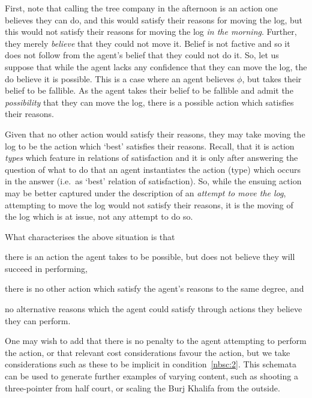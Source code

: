 \documentclass[10pt]{article}
\begin{document}
{First, note that calling the tree company in the afternoon is an action one believes they can do, and this would satisfy their reasons for moving the log, but this would not satisfy their reasons for moving the log \emph{in the morning}.
Further, they merely \emph{believe} that they could not move it.
Belief is not factive and so it does not follow from the agent's belief that they could not do it.
So, let us suppose that while the agent lacks any confidence that they can move the log, the do believe it is possible.
This is a case where an agent believes \(\phi\), but takes their belief to be fallible.
As the agent takes their belief to be fallible and admit the \emph{possibility} that they can move the log, there is a possible action which satisfies their reasons.

Given that no other action would satisfy their reasons, they may take moving the log to be the action which `best' satisfies their reasons.
Recall, that it is action \emph{types} which feature in relations of satisfaction and it is only after answering the question of what to do that an agent instantiates the action (type) which occurs in the answer (i.e.\ as `best' relation of satisfaction).
So, while the ensuing action may be better captured under the description of an \emph{attempt to move the log}, attempting to move the log would not satisfy their reasons, it is the moving of the log which is at issue, not any attempt to do so.

What characterises the above situation is that
\begin{enumerate*}[label=\alph*)]
\item\label{nbsc:3} there is an action the agent takes to be possible, but does not believe they will succeed in performing,
\item\label{nbsc:1} there is no other action which satisfy the agent's reasons to the same degree, and
\item\label{nbsc:2} no alternative reasons which the agent could satisfy through actions they believe they can perform.
\end{enumerate*}
One may wish to add that there is no penalty to the agent attempting to perform the action, or that relevant cost considerations favour the action, but we take considerations such as these to be implicit in condition~\ref{nbsc:2}.
This schemata can be used to generate further examples of varying content, such as shooting a three-pointer from half court, or scaling the Burj Khalifa from the outside.

}
\end{document}
